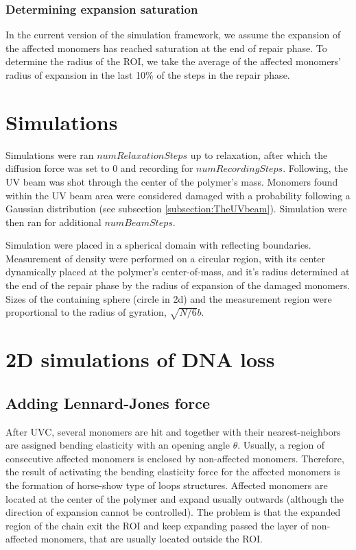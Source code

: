\documentclass[12pt]{report}
\begin{document}
    \subsubsection{Determining expansion saturation}
     In the current version of the simulation framework, we assume the expansion of the affected monomers has reached saturation at the end of repair phase. To determine the radius of the ROI, we take the average of the affected monomers' radius of expansion in the last 10\% of the steps in the repair phase. 
    		             		
	\section{Simulations}\label{section:Simulations}
	
	Simulations were ran $numRelaxationSteps$ up to relaxation, after which the diffusion force was set to $0$ and recording for $numRecordingSteps$. Following, the UV beam was shot through the center of the polymer's mass. Monomers found within the UV beam area were considered damaged with a probability following a Gaussian distribution (see subsection \ref{subsection:TheUVbeam}). Simulation were then ran for additional $numBeamSteps$.
	
	Simulation were placed in a spherical domain with reflecting boundaries.
	Measurement of density were performed on a circular region, with its center dynamically placed at the polymer's center-of-mass, and it's radius determined at the end of the repair phase by the radius of expansion of the damaged monomers.
	Sizes of the containing sphere (circle in 2d) and the measurement region were proportional to the radius of gyration, $\sqrt{N/6}b$.
	

	  
	\section{2D simulations of DNA loss}
	 
	\subsection{Adding Lennard-Jones force}
      After UVC, several monomers are hit and together with their nearest-neighbors are assigned bending elasticity with an opening angle $\theta$. Usually, a region of consecutive affected monomers is enclosed by non-affected monomers. Therefore, the result of activating the bending elasticity force for the affected monomers is the formation of horse-show type of loops structures. 
      Affected monomers are located at the center of the polymer and expand usually outwards (although the direction of expansion cannot be controlled). The problem is that the expanded region of the chain exit the ROI and keep expanding passed the layer of non-affected monomers, that are usually located outside the ROI. 
      
\end{document}
